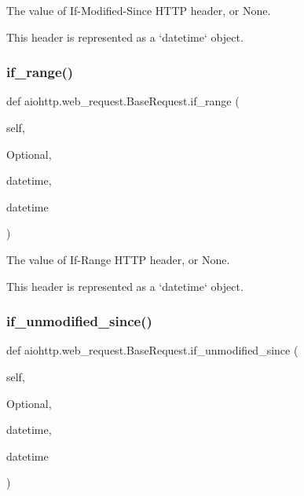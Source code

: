 \begin{DoxyVerb}The value of If-Modified-Since HTTP header, or None.

This header is represented as a `datetime` object.
\end{DoxyVerb}
 \mbox{\label{classaiohttp_1_1web__request_1_1_base_request_a371dad6f6481e596771aec215e18c565}} 
\subsubsection{\texorpdfstring{if\+\_\+range()}{if\_range()}}
{\footnotesize\ttfamily def aiohttp.\+web\+\_\+request.\+Base\+Request.\+if\+\_\+range (\begin{DoxyParamCaption}\item[{}]{self,  }\item[{}]{Optional,  }\item[{}]{datetime,  }\item[{}]{datetime }\end{DoxyParamCaption})}

\begin{DoxyVerb}The value of If-Range HTTP header, or None.

This header is represented as a `datetime` object.
\end{DoxyVerb}
 \mbox{\label{classaiohttp_1_1web__request_1_1_base_request_a072943ea0bc137850b807bd2df7a5ebe}} 
\subsubsection{\texorpdfstring{if\+\_\+unmodified\+\_\+since()}{if\_unmodified\_since()}}
{\footnotesize\ttfamily def aiohttp.\+web\+\_\+request.\+Base\+Request.\+if\+\_\+unmodified\+\_\+since (\begin{DoxyParamCaption}\item[{}]{self,  }\item[{}]{Optional,  }\item[{}]{datetime,  }\item[{}]{datetime }\end{DoxyParamCaption})}

